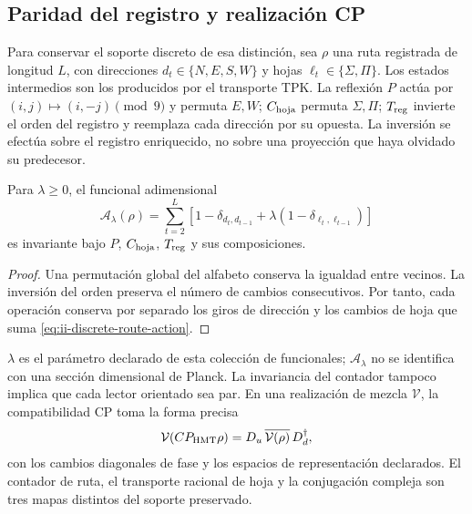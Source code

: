 \subsection{Paridad del registro y realización CP}

Para conservar el soporte discreto de esa distinción, sea \(\rho\) una
ruta registrada de longitud \(L\), con direcciones
\(d_t\in\{N,E,S,W\}\) y hojas \(\ell_t\in\{\Sigma,\Pi\}\).
Los estados intermedios son los producidos por el transporte TPK.
La reflexión \(P\) actúa por \((i,j)\mapsto(i,-j)\pmod9\) y
permuta \(E,W\); \(C_{\rm hoja}\) permuta \(\Sigma,\Pi\);
\(T_{\rm reg}\) invierte el orden del registro y reemplaza cada
dirección por su opuesta. La inversión se efectúa sobre el registro
enriquecido, no sobre una proyección que haya olvidado su predecesor.

\begin{proposition}
Para \(\lambda\ge0\), el funcional adimensional
\begin{equation}
 \mathcal A_\lambda(\rho)=
 \sum_{t=2}^{L}\left[1-\delta_{d_t,d_{t-1}}
             +\lambda(1-\delta_{\ell_t,\ell_{t-1}})\right]
 \label{eq:ii-discrete-route-action}
\end{equation}
es invariante bajo \(P\), \(C_{\rm hoja}\), \(T_{\rm reg}\) y
sus composiciones.
\end{proposition}

\begin{proof}
Una permutación global del alfabeto conserva la igualdad entre vecinos.
La inversión del orden preserva el número de cambios consecutivos.
Por tanto, cada operación conserva por separado los giros de dirección
y los cambios de hoja que suma \eqref{eq:ii-discrete-route-action}.
\end{proof}

\(\lambda\) es el parámetro declarado de esta colección de funcionales;
\(\mathcal A_\lambda\) no se identifica con una sección dimensional de
Planck. La invariancia del contador tampoco implica que cada lector
orientado sea par. En una realización de mezcla \(\mathcal V\), la
compatibilidad CP toma la forma precisa
\begin{equation}
 \mathcal V(CP_{\rm HMT}\rho)
 =D_u\,\overline{\mathcal V(\rho)}\,D_d^\dagger,
 \label{eq:ii-cp-square}
\end{equation}
con los cambios diagonales de fase y los espacios de representación
declarados. El contador de ruta, el transporte racional de hoja y la
conjugación compleja son tres mapas distintos del soporte preservado.

